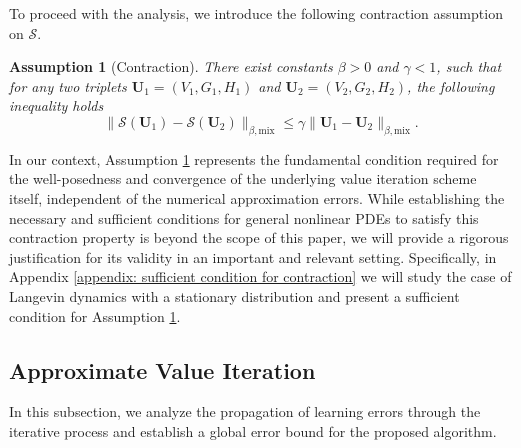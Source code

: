 \documentclass[twoside,11pt]{article}
\newtheorem{assumption}{Assumption}
\newcommand{\1}{\mathbf{1}}
\numberwithin{equation}{section}
\begin{document}
To proceed with the analysis, we introduce the following contraction assumption on $\mathcal{S}$.
\begin{assumption}[Contraction]\label{assum: contraction}
    There exist constants $\beta > 0$ and $\gamma < 1$, such that for any two triplets $\mathbf{U}_1 = (V_1, G_1, H_1)$ and $\mathbf{U}_2 = (V_2, G_2, H_2)$, the following inequality holds
    \begin{equation}
        \|\mathcal{S}(\mathbf{U}_1) - \mathcal{S}(\mathbf{U}_2)\|_{\beta, \text{mix}} \le \gamma \|\mathbf{U}_1 - \mathbf{U}_2\|_{\beta, \text{mix}}.
    \end{equation}
\end{assumption}

In our context, Assumption \ref{assum: contraction} represents the fundamental condition required for the well-posedness and convergence of the underlying value iteration scheme itself, independent of the numerical approximation errors.  While establishing the necessary and sufficient conditions for general nonlinear PDEs to satisfy this contraction property is beyond the scope of this paper, we will provide a rigorous justification for its validity in an important and relevant setting. Specifically, in Appendix \ref{appendix: sufficient condition for contraction} we will study the case of Langevin dynamics with a stationary distribution and  present a sufficient condition for Assumption \ref{assum: contraction}. %

\subsection{Approximate Value Iteration}

In this subsection, we analyze the propagation of learning errors through the iterative process and establish a global error bound for the proposed algorithm.
\end{document}
